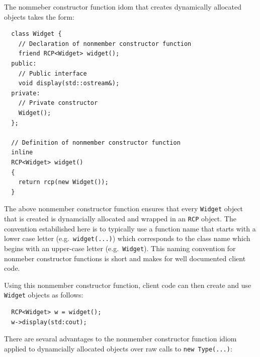 \documentclass[pdf,ps2pdf,11pt]{SANDreport}
\begin{document}
The nommeber constructor function idom that creates dynamically allocated
objects takes the form:

{\small\begin{verbatim}
  class Widget {
    // Declaration of nonmember constructor function
    friend RCP<Widget> widget();
  public:
    // Public interface
    void display(std::ostream&);
  private:
    // Private constructor
    Widget();
  };

  // Definition of nonmember constructor function
  inline
  RCP<Widget> widget()
  {
    return rcp(new Widget());
  }
\end{verbatim}}

The above nonmember constructor function ensures that every {}\texttt{Widget}
object that is created is dynamcially allocated and wrapped in an
{}\texttt{RCP} object.  The convention estabilished here is to typically use a
function name that starts with a lower case letter (e.g.\
{}\texttt{widget(...)}) which corresponds to the class name which begins with
an upper-case letter (e.g.\ {}\texttt{Widget}).  This naming convention for
nonmeber constructor functions is short and makes for well documented client
code.

Using this nonmember constructor function, client code can then create and use
{}\texttt{Widget} objects as follows:

{\small\begin{verbatim}
  RCP<Widget> w = widget();
  w->display(std:cout);
\end{verbatim}}

There are sevaral advantages to the nonmember constructor function idiom
applied to dynamcially allocated objects over raw calls to {}\texttt{new
Type(...)}:
\end{document}
